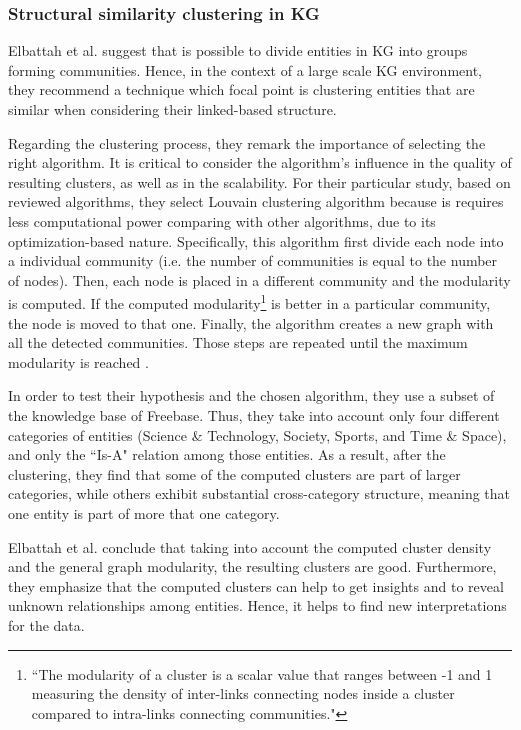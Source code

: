 \documentclass[runningheads]{llncs}
\begin{document}
\subsubsection{Structural similarity clustering in KG} \label{structural-similarity}
Elbattah et al. \cite{Elbattah} suggest that is possible to divide entities in KG into groups forming communities. Hence, in the context of a large scale KG environment, they recommend a technique which focal point is clustering entities that are similar when considering their linked-based structure.

Regarding the clustering process, they remark the importance of selecting the right algorithm. It is critical to consider the algorithm's influence in the quality of resulting clusters, as well as in the scalability. For their particular study, based on reviewed algorithms, they select Louvain clustering algorithm because is requires less computational power comparing with other algorithms, due to its optimization-based nature. Specifically, this algorithm first divide each node into a individual community (i.e. the number of communities is equal to the number of nodes). Then, each node is placed in a different community and the modularity is computed. If the computed modularity\footnote{``The modularity of a cluster is a scalar value that ranges between -1 and 1 measuring the density of inter-links connecting nodes inside a cluster compared to intra-links connecting communities."\cite{Elbattah}} is better in a particular community, the node is moved to that one. Finally, the algorithm creates a new graph with all the detected communities. Those steps are repeated until the maximum modularity is reached \cite{Elbattah}.

In order to test their hypothesis and the chosen algorithm, they use a subset of the knowledge base of Freebase. Thus, they take into account only four different categories of entities (Science \& Technology, Society, Sports, and Time \& Space), and only the ``Is-A" relation among those entities. As a result, after the clustering, they find that some of the computed clusters are part of larger categories, while others exhibit substantial cross-category structure, meaning that one entity is part of more that one category. 

Elbattah et al. \cite{Elbattah} conclude that taking into account the computed cluster density and the general graph modularity, the resulting clusters are good. Furthermore, they emphasize that the computed clusters can help to get insights and to reveal unknown relationships among entities. Hence, it helps to find new interpretations for the data.
\end{document}
